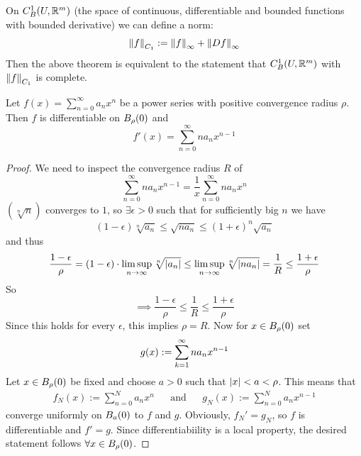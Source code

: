 \documentclass[../../script.tex]{subfiles}
\begin{document}
\begin{rem}
    On $C_B^1(U, \realn^m)$ (the space of continuous, differentiable and bounded functions with bounded derivative) we can define a norm:
    \[
        \cnorm{f} := \supnorm{f} + \supnorm{Df}
    \]
    Then the above theorem is equivalent to the statement that $C_B^1(U, \realn^m)$ with $\cnorm{f}$ is complete.
\end{rem}

\begin{thm}
    Let $f(x) = \sum_{n=0}^{\infty} a_n x^n$ be a power series with positive convergence radius $\rho$.
    Then $f$ is differentiable on $\oball[\rho](0)$ and 
    \[
        f'(x) = \sum_{n=0}^{\infty} n a_n x^{n-1}
    \]
\end{thm}
\begin{proof}
    We need to inspect the convergence radius $R$ of 
    \begin{equation}
        \sum_{n=0}^{\infty} n a_n x^{n-1} = \frac{1}{x} \sum_{n=0}^{\infty} n a_n x^{n}
    \end{equation}
    $(\sqrt[n]{n})$ converges to $1$, so $\exists \epsilon > 0$ such that for sufficiently big $n$ we have 
    \begin{equation}
        (1 - \epsilon)\sqrt[n]{a_n} \le \sqrt{n a_n} \le (1 + \epsilon)^n \sqrt{a_n}
    \end{equation}
    and thus 
    \begin{equation}
        \frac{1 - \epsilon}{\rho} = (1 - \epsilon) \cdot \limsupn \sqrt[n]{\abs{a_n}} \le \limsupn \sqrt[n]{\abs{n a_n}} = \frac{1}{R} \le \frac{1 + \epsilon}{\rho}
    \end{equation}
    So 
    \begin{equation}
        \implies \frac{1 - \epsilon}{\rho} \le \frac{1}{R} \le \frac{1 + \epsilon}{\rho}
    \end{equation}
    Since this holds for every $\epsilon$, this implies $\rho = R$. 
    Now for $x \in \oball[\rho](0)$ set
    \begin{equation}
        g(x) := \series{k} n a_n x^{n - 1}
    \end{equation}
    Let $x \in \oball[\rho](0)$ be fixed and choose $a > 0$ such that $\abs{x} < a < \rho$.
    This means that 
    \begin{align*}
        f_N(x) := \sum_{n=0}^{N} a_n x^n && \text{and} && g_N(x) := \sum_{n=0}^{N} a_nx^{n-1}
    \end{align*}
    converge uniformly on $\oball[a](0)$ to $f$ and $g$.
    Obviously, $f_N' = g_N$, so $f$ is differentiable and $f' = g$.
    Since differentiabiility is a local property, the desired statement follows $\forall x \in \oball[\rho](0)$.
\end{proof}
\end{document}
